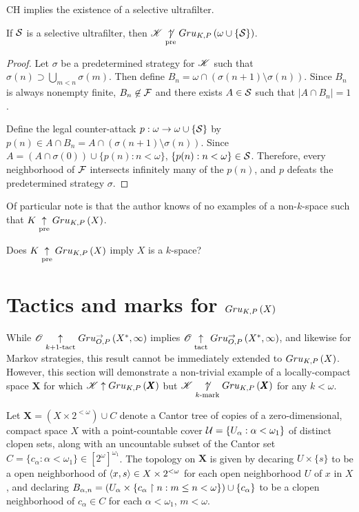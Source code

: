 \begin{thm}
  CH implies the existence of a selective ultrafilter.
  \cite{MR0080902}
\end{thm}

\begin{thm}
  If $\mathcal{S}$ is a selective ultrafilter, then
  $\mathscr{K}\underset{\text{pre}}{\not\uparrow} Gru_{K,P}\left({\omega\cup\{\mathcal{S}\}}\right)$.
\end{thm}

\begin{proof}
  Let $\sigma$ be a predetermined strategy for $\mathscr{K}$ such that
  $\sigma(n)\supset\bigcup_{m<n}\sigma(m)$.
  Then define $B_n=\omega\cap(\sigma(n+1)\setminus\sigma(n))$. Since $B_n$
  is always nonempty finite, $B_n\not\in\mathcal{F}$ and there exists $A\in \mathcal{S}$
  such that $|A\cap B_n|=1$.

  Define the legal counter-attack $p:\omega\to\omega\cup\{\mathcal{S}\}$ by
  $p(n)\in A\cap B_n=A\cap(\sigma(n+1)\setminus\sigma(n))$. Since
  $A=(A\cap\sigma(0))\cup\{p(n):n<\omega\}$, $\{p(n):n<\omega\}\in\mathcal{S}$.
  Therefore, every neighborhood of $\mathcal{F}$ intersects infinitely many of
  the $p(n)$, and $p$ defeats the predetermined strategy $\sigma$.
\end{proof}

Of particular note is that the author knows of no examples of a
non-$k$-space such that $K\underset{\text{pre}}{\uparrow}Gru_{K,P}\left({X}\right)$.

\begin{ques}
  Does $K\underset{\text{pre}}{\uparrow}Gru_{K,P}\left({X}\right)$ imply $X$ is a $k$-space?
\end{ques}


\section{Tactics and marks for $Gru_{K,P}\left({X}\right)$}

While $\mathscr{O}\underset{k+1\text{-tact}}{\uparrow}Gru_{O,P}^{\to}\left({X^*},{\infty}\right)$ implies
$\mathscr{O}\underset{\text{tact}}{\uparrow}Gru_{O,P}^{\to}\left({X^*},{\infty}\right)$, and likewise for Markov
strategies, this result cannot be
immediately extended to $Gru_{K,P}\left({X}\right)$. However, this section will
demonstrate a non-trivial example of a locally-compact space $\pmb X$ for which
$\mathscr{K}\uparrow Gru_{K,P}\left({\pmb X}\right)$ but $\mathscr{K}\underset{k\text{-mark}}{\not\uparrow}Gru_{K,P}\left({\pmb X}\right)$
for any $k<\omega$.

\begin{defn}
  Let $\pmb X=(X\times 2^{<\omega})\cup C$ denote a Cantor tree
  of copies of a zero-dimensional, compact space $X$ with a point-countable
  cover $\mathcal{U} = \{U_\alpha : \alpha<\omega_1\}$ of distinct
  clopen sets, along with an uncountable subset of the Cantor set
  $C=\{c_\alpha:\alpha<\omega_1\}\in [2^\omega]^{\omega_1}$.
  The topology on $\pmb X$ is given by decaring $U\times\{s\}$ to be a open
  neighborhood of $\langle x,s\rangle\in X\times 2^{<\omega}$ for each
  open neighborhood $U$ of $x$ in $X$, and declaring
  $B_{\alpha,n}=(U_\alpha\times\{c_\alpha\restriction n: m\leq n<\omega\})\cup\{c_\alpha\}$
  to be a clopen neighborhood of $c_\alpha\in C$ for each $\alpha<\omega_1$,
  $m<\omega$.
\end{defn}

